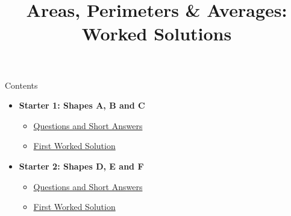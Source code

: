 \documentclass{beamer}
\title{Areas, Perimeters \& Averages: Worked Solutions}
\author{}
\date{}
\begin{document}
\frame{\titlepage}

\begin{frame}{Contents}
\small
\begin{itemize}
  \item \textbf{Starter 1: Shapes A, B and C}
  \begin{itemize}
    \item \hyperlink{starter1qs}{Questions and Short Answers}
    \item \hyperlink{starter1work}{First Worked Solution}
  \end{itemize}
  \item \textbf{Starter 2: Shapes D, E and F}
  \begin{itemize}
    \item \hyperlink{starter2qs}{Questions and Short Answers}
    \item \hyperlink{starter2work}{First Worked Solution}
  \end{itemize}
\end{itemize}
\end{frame}
\end{document}
